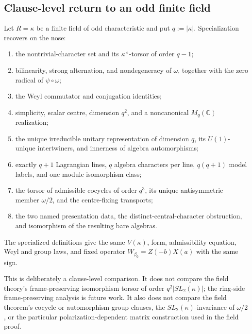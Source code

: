 
\subsection{Clause-level return to an odd finite field}

\statusProvedConditional
\begin{theorem}
\label{thm:local-field-regression}
Let $R=\kappa$ be a finite field of odd characteristic and put
$q:=|\kappa|$.  Specialization recovers on the nose:
\begin{enumerate}[label=(\roman*)]
\item the nontrivial-character set and its $\kappa^\times$-torsor of order
      $q-1$;
\item bilinearity, strong alternation, and nondegeneracy of $\omega$, together
      with the zero radical of $\psi\circ\omega$;
\item the Weyl commutator and conjugation identities;
\item simplicity, scalar centre, dimension $q^2$, and a noncanonical
      $M_q(\mathbb C)$ realization;
\item the unique irreducible unitary representation of dimension $q$, its
      $U(1)$-unique intertwiners, and innerness of algebra automorphisms;
\item exactly $q+1$ Lagrangian lines, $q$ algebra characters per line,
      $q(q+1)$ model labels, and one module-isomorphism class;
\item the torsor of admissible cocycles of order $q^3$, its unique
      antisymmetric member $\omega/2$, and the centre-fixing transports;
\item the two named presentation data, the distinct-central-character
      obstruction, and isomorphism of the resulting bare algebras.
\end{enumerate}
The specialized definitions give the same $V(\kappa)$, form, admissibility
equation, Weyl and group laws, and fixed operator
$W_{\beta_0}=Z(-b)X(a)$ with the same sign.
\end{theorem}

\begin{scope}
This is deliberately a clause-level comparison.  It does not compare the
field theory's frame-preserving isomorphism torsor of order
$q^2|SL_2(\kappa)|$; the ring-side frame-preserving analysis is future work.
It also does not compare the field theorem's cocycle or automorphism-group
clauses, the $SL_2(\kappa)$-invariance of $\omega/2$, or the particular
polarization-dependent matrix construction used in the field proof.
\end{scope}

